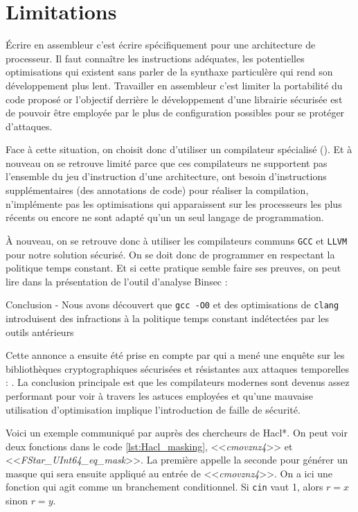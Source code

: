 \section{Limitations}
\label{sect:limitations}

Écrire en assembleur c'est écrire spécifiquement pour une architecture de processeur. Il faut connaître les instructions adéquates, les potentielles optimisations qui existent sans parler de la synthaxe particulère qui rend son développement plus lent. Travailler en assembleur c'est limiter la portabilité du code proposé or l'objectif derrière le développement d'une librairie sécurisée est de pouvoir être employée par le plus de configuration possibles pour se protéger d'attaques.\smallbreak

Face à cette situation, on choisit donc d'utiliser un compilateur spécialisé (\cite{Borrello_2021, Raccoon}). Et à nouveau on se retrouve limité parce que ces compilateurs ne supportent pas l'ensemble du jeu d'instruction d'une architecture, ont besoin d'instructions supplémentaires (des annotations de code) pour réaliser la compilation, n'implémente pas les optimisations qui apparaissent sur les processeurs les plus récents ou encore ne sont adapté qu'un un seul langage de programmation.\smallbreak

À nouveau, on se retrouve donc à utiliser les compilateurs communs \texttt{GCC} et \texttt{LLVM} pour notre solution sécurisé. On se doit donc de programmer en respectant la politique temps constant. Et si cette pratique semble faire ses preuves, on peut lire dans la présentation de l'outil d'analyse Binsec  : 
\begin{CitationBox}{Conclusion - \cite{binsecRel2019}}
Nous avons découvert que \texttt{gcc -O0} et des optimisations de \texttt{clang} introduisent des infractions à la politique temps constant indétectées par les outils antérieurs
\end{CitationBox}\smallbreak

Cette annonce a ensuite été prise en compte par \citeauthor{schneider2024breakingbadcompilersbreak} qui a mené une enquête sur les bibliothèques cryptographiques sécurisées et résistantes aux attaques temporelles : \cite{schneider2024breakingbadcompilersbreak}. La conclusion principale est que les compilateurs modernes sont devenus assez performant pour voir à travers les astuces employées et qu'une mauvaise utilisation d'optimisation implique l'introduction de faille de sécurité. \smallbreak

Voici un exemple communiqué par \citeauthor{schneider2024breakingbadcompilersbreak} auprès des chercheurs de Hacl*. On peut voir deux fonctions dans le code \ref{lst:Hacl_masking}, <<\textit{cmovznz4}>> et <<\textit{FStar\_UInt64\_eq\_mask}>>. La première appelle la seconde pour générer un masque qui sera ensuite appliqué au entrée de <<\textit{cmovznz4}>>. On a ici une fonction qui agit comme un branchement conditionnel. Si \texttt{cin} vaut 1, alors $r = x$ sinon $r = y$.


